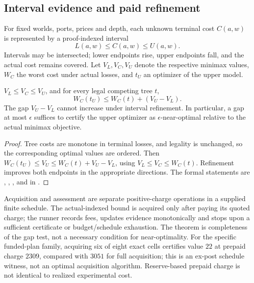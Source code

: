 \subsection{Interval evidence and paid refinement}
For fixed worlds, ports, prices and depth, each unknown terminal cost $C(a,w)$ is represented by a proof-indexed interval
\[
  L(a,w)\le C(a,w)\le U(a,w).
\]
Intervals may be intersected; lower endpoints rise, upper endpoints fall, and the actual cost remains covered. Let $V_L,V_C,V_U$ denote the respective minimax values, $W_C$ the worst cost under actual losses, and $t_U$ an optimizer of the upper model.
\begin{theorem}\label{thm:interval}
$V_L\le V_C\le V_U$, and for every legal competing tree $t$,
\[
 W_C(t_U)\le W_C(t)+(V_U-V_L).
\]
The gap $V_U-V_L$ cannot increase under interval refinement. In particular, a gap at most $\epsilon$ suffices to certify the upper optimizer as $\epsilon$-near-optimal relative to the actual minimax objective.
\end{theorem}
\begin{proof}
Tree costs are monotone in terminal losses, and legality is unchanged, so the corresponding optimal values are ordered. Then $W_C(t_U)\le V_U\le W_C(t)+V_U-V_L$, using $V_L\le V_C\le W_C(t)$. Refinement improves both endpoints in the appropriate directions. The formal statements are , , , and  in .
\end{proof}
Acquisition and assessment are separate positive-charge operations in a supplied finite schedule. The actual-indexed bound is acquired only after paying its quoted charge; the runner records fees, updates evidence monotonically and stops upon a sufficient certificate or budget/schedule exhaustion. The theorem  is completeness of the gap test, not a necessary condition for near-optimality. For the specific funded-plan family, acquiring six of eight exact cells certifies value $22$ at prepaid charge $2309$, compared with $3051$ for full acquisition; this is an ex-post schedule witness, not an optimal acquisition algorithm. Reserve-based prepaid charge is not identical to realized experimental cost.

